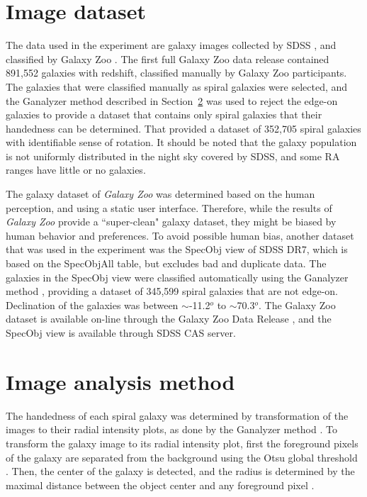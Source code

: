\documentclass[times,twocolumn]{article}
\begin{document}
\section{Image dataset}
\label{dataset}

The data used in the experiment are galaxy images collected by SDSS \citep{Yor00}, and classified by Galaxy Zoo \citep{Lin08}. The first full Galaxy Zoo data release contained 891,552 galaxies with redshift, classified manually by Galaxy Zoo participants. The galaxies that were classified manually as spiral galaxies were selected, and the Ganalyzer method described in Section~\ref{method} was used to reject the edge-on galaxies to provide a dataset that contains only spiral galaxies that their handedness can be determined. That provided a dataset of 352,705 spiral galaxies with identifiable sense of rotation. It should be noted that the galaxy population is not uniformly distributed in the night sky covered by SDSS, and some RA ranges have little or no galaxies.

The galaxy dataset of {\it Galaxy Zoo} was determined based on the human perception, and using a static user interface. Therefore, while the results of {\it Galaxy Zoo} provide a ``super-clean" galaxy dataset, they might be biased by human behavior and preferences. To avoid possible human bias, another dataset that was used in the experiment was the SpecObj view of SDSS DR7, which is based on the SpecObjAll table, but excludes bad and duplicate data. The galaxies in the SpecObj view were classified automatically using the Ganalyzer method \citep{Sha11}, providing a dataset of 345,599 spiral galaxies that are not edge-on. Declination of the galaxies was between $\sim$-11.2$^o$ to $\sim$70.3$^o$. The Galaxy Zoo dataset is available on-line through the Galaxy Zoo Data Release \citep{Lin10}, and the SpecObj view is available through SDSS CAS server.

\section{Image analysis method}
\label{method}

The handedness of each spiral galaxy was determined by transformation of the images to their radial intensity plots, as done by the Ganalyzer method \citep{Sha11,Sha11b}. To transform the galaxy image to its radial intensity plot, first the foreground pixels of the galaxy are separated from the background using the Otsu global threshold \citep{Ots79}. Then, the center of the galaxy is detected, and the radius is determined by the maximal distance between the object center and any foreground pixel \citep{Sha11}.
\end{document}
